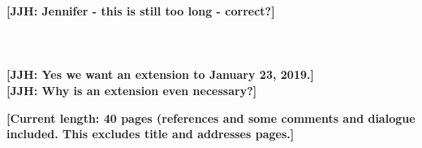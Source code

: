 \begin{titlepage}
\author{
Jorge Luis Garc\'{i}a\\
Department of Economics\\
The University of Chicago \and
James J. Heckman \\
American Bar Foundation \\
Department of Economics\\
The University of Chicago \and
Duncan Ermini Leaf \\
Leonard D. Schaeffer Center \\  for Health Policy and Economics\\
University of Southern California \and
Mar\'{i}a Jos\'{e} Prados \\
Dornsife Center for \\ Economic and Social Research\\
University of Southern California}
\date{First Draft: January 5, 2016\\ This Draft: \today}

\maketitle
\thispagestyle{empty}
\restoregeometry
\end{titlepage}

\singlespacing
\thispagestyle{empty}

\noindent \textbf{[JJH: Jennifer - this is still too long - correct?] \\ 
\\ 
\\ 
}\\ 
\noindent \textbf{[JJH: Yes we want an extension to January 23, 2019.]} \\
\noindent \textbf{[JJH: Why is an extension even necessary?]}

\bigskip 
\noindent \textbf{[Current length: 40 pages (references and some comments and dialogue included. This excludes title and addresses pages.]}


